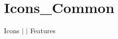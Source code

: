 \chapter{Icons\+\_\+\+Common }
\hypertarget{md__docs_2_common_2_features_2_icons___common}{}\label{md__docs_2_common_2_features_2_icons___common}
Icons \texorpdfstring{$\vert$}{|}  \texorpdfstring{$\vert$}{|} Features



 